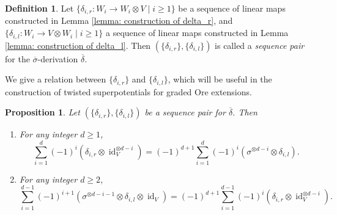 \documentclass[a4paper,10pt]{amsart}
\newtheorem{proposition}[theorem]{Proposition}
\theoremstyle{definition}
\newtheorem{definition}[theorem]{Definition}
\numberwithin{equation}{section}
\DeclareMathOperator{\id}{id}
\begin{document}
\begin{definition} Let $\{\delta_{i,r}:W_i\to W_i\otimes V\mid i\geq 1\}$ be a sequence of linear maps constructed in Lemma \ref{lemma: construction of delta_r}, and  $\{\delta_{i,l}:W_i\to V\otimes W_i \mid i\geq 1\}$ a sequence of linear maps constructed in Lemma \ref{lemma: construction of delta_l}. Then
$\left(\{\delta_{i,r}\},\{\delta_{i,l}\}\right)$ is called a \emph{sequence pair} for the $\overline{\sigma}$-derivation $\overline{\delta}$.
\end{definition}

We give a relation between $\{\delta_{i,r}\}$ and $\{\delta_{i,l}\}$, which will be useful in the construction of twisted superpotentials for graded Ore extensions.

\begin{proposition}\label{prop: relation between delta_r and delta_l}
Let $\left(\{\delta_{i,r}\},\{\delta_{i,l}\}\right)$ be a sequence pair for $\overline{\delta}$. Then
\begin{enumerate}
\item For any integer $d\geq 1$,
$$
\sum_{i=1}^d (-1)^{i}(\delta_{i,r}\otimes\id_V^{\otimes d-i})=(-1)^{d+1}\sum_{i=1}^{d}(-1)^{i}(\sigma^{\otimes d-i}\otimes\delta_{i,l}).
$$
\item For any integer $d\geq 2$, $$
\sum_{i=1}^{d-1}(-1)^{i+1}(\sigma^{\otimes d-i-1}\otimes \delta_{i,l}\otimes\id_V)=(-1)^{d+1}\sum_{i=1}^{d-1}(-1)^i(\delta_{i,r}\otimes\id_V^{\otimes d-i}).
$$
\end{enumerate}

\end{proposition}
\end{document}
